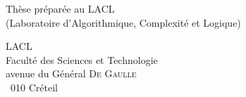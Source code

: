 \cleardoublepage
\setcounter{page}{1}
\mbox{}
\clearpage
\mbox{}
\vfill
\noindent
Thèse préparée au LACL\\
\noindent
(Laboratoire d'Algorithmique, Complexité et Logique)

\bigskip

\noindent
LACL\\
\noindent
Faculté des Sciences et Technologie\\
 avenue du Général {\scshape De Gaulle}\\
 010 Créteil
